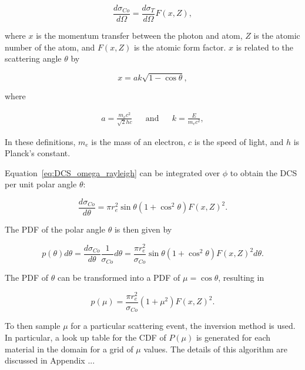 \begin{equation}
    \frac{d\sigma_{Co}}{d\Omega} = \frac{d\sigma_T}{d\Omega} F(x, Z),
    \label{eq:DCS_omega_rayleigh}
\end{equation}

where $x$ is the momentum transfer between the photon and atom, $Z$ is the atomic number of the atom, and $F(x, Z)$ is the atomic form factor. $x$ is related to the scattering angle $\theta$ by

\begin{equation}
    x = ak\sqrt{1 - \cos\theta},
\end{equation}

where

\begin{align}
    a = \frac{m_e c^2}{\sqrt{2}hc} && \textrm{and} && k = \frac{E}{m_e c^2},
\end{align}

\par In these definitions, $m_e$ is the mass of an electron, $c$ is the speed of light, and $h$ is Planck's constant.

\par Equation~\ref{eq:DCS_omega_rayleigh} can be integrated over $\phi$ to obtain the DCS per unit polar angle $\theta$:

\begin{equation}
    \frac{d\sigma_{Co}}{d\theta} = \pi r_e^2 \sin \theta (1 + \cos^2 \theta) F(x, Z)^2.
\end{equation}

\par The PDF of the polar angle $\theta$ is then given by

\begin{equation}
    p(\theta) d\theta = \frac{d\sigma_{Co}}{d\theta} \frac{1}{\sigma_{Co}} d\theta = \frac{\pi r_e^2}{\sigma_{Co}} \sin \theta (1 + \cos^2 \theta) F(x, Z)^2 d \theta.
\end{equation}

\par The PDF of $\theta$ can be transformed into a PDF of $\mu = \cos \theta$, resulting in

\begin{equation}
    p(\mu) = \frac{\pi r_e^2}{\sigma_{Co}} (1 + \mu^2) F(x, Z)^2.
\end{equation}

\par To then sample $\mu$ for a particular scattering event, the inversion method is used. In particular, a look up table for the CDF of $P(\mu)$ is generated for each material in the domain for a grid of $\mu$ values. The details of this algorithm are discussed in Appendix ...

